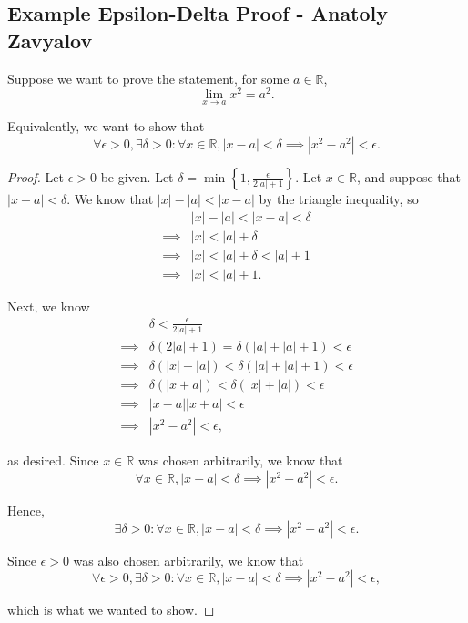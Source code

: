 \documentclass[12pt]{article}
\begin{document}
\begin{center}
    \section*{Example Epsilon-Delta Proof - Anatoly Zavyalov}
\end{center}

Suppose we want to prove the statement, for some \(a \in \mathbb{R}\),
\[
    \lim_{x \to a} x^2 = a^2.
\]

Equivalently, we want to show that
\[
    \forall \epsilon > 0, \exists \delta > 0: \forall x \in \mathbb{R}, |x-a| < \delta \implies \left| x^2 - a^2 \right| < \epsilon. 
\]

\begin{proof}[Proof]
    

Let \(\epsilon > 0\) be given. Let \(\delta = \displaystyle \min \left\{ 1, \frac{\epsilon}{2|a| + 1} \right\} \). Let \(x \in \mathbb{R}\), and suppose that \(|x-a| < \delta\). We know that \(|x|-|a| < |x-a|\) by the triangle inequality, so
\begin{align*}
    &|x|-|a| < |x-a| < \delta \\ 
    \implies& |x| < |a| + \delta \\ 
    \implies& |x| < |a| + \delta < |a| + 1 \tag*{as \(\delta < 1\)} \\ 
    \implies& |x| < |a| + 1.
\end{align*}

Next, we know
\begin{align*}
    &\delta < \frac{\epsilon}{2 |a| + 1} \\ 
    \implies& \delta \left( 2|a| + 1 \right) = \delta \left( |a| + |a| + 1 \right) < \epsilon \\ 
    \implies& \delta \left( |x| + |a| \right) < \delta \left( |a| + |a| + 1 \right) < \epsilon \\ 
    \implies& \delta \left( |x+a| \right) < \delta \left( |x| + |a| \right) < \epsilon \tag*{by the triangle inequality}\\ 
    \implies& |x-a||x+a| < \epsilon \tag*{as \(|x-a| < \delta\)} \\ 
    \implies& |x^2 - a^2| < \epsilon,
\end{align*}

as desired. Since \(x \in \mathbb{R}\) was chosen arbitrarily, we know that
\[
    \forall x \in \mathbb{R}, |x-a| < \delta \implies \left| x^2 - a^2 \right| < \epsilon.
\]

Hence,
\[
    \exists \delta > 0: \forall x \in \mathbb{R}, |x-a| < \delta \implies \left| x^2 - a^2 \right| < \epsilon.
\]

Since \(\epsilon > 0\) was also chosen arbitrarily, we know that
\[
    \forall \epsilon > 0, \exists \delta > 0: \forall x \in \mathbb{R}, |x-a| < \delta \implies \left| x^2 - a^2 \right| < \epsilon,
\]

which is what we wanted to show.


\end{proof}
\end{document}
